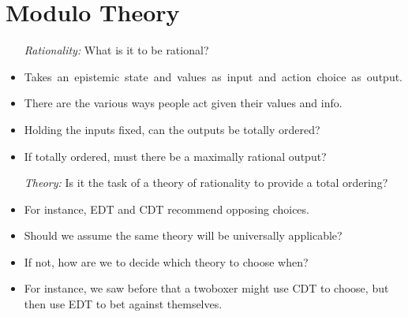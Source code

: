 \documentclass[a4paper, 11pt]{article} %
\begin{document}
\section*{Modulo Theory}

\begin{itemize}
  \item[\it Rationality:] What is it to be rational?
    \item \mbox{Takes an epistemic state and values as input and action choice as output.}
    \item There are the various ways people act given their values and info.
    \item Holding the inputs fixed, can the outputs be totally ordered?
    \item If totally ordered, must there be a maximally rational output?
  \item[\it Theory:] Is it the task of a theory of rationality to provide a total ordering?
    \item For instance, EDT and CDT recommend opposing choices.
    \item Should we assume the same theory will be universally applicable?
    \item If not, how are we to decide which theory to choose when?
    \item For instance, we saw before that a twoboxer might use CDT to choose, but then use EDT to bet against themselves.
\end{itemize}



\end{document}

